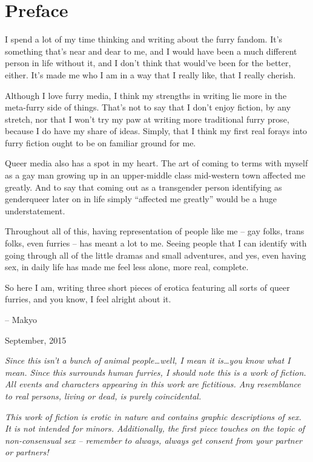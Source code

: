\chapter*{Preface}

I spend a lot of my time thinking and writing about the furry fandom.  It's something that's near and dear to me, and I would have been a much different person in life without it, and I don't think that would've been for the better, either.  It's made me who I am in a way that I really like, that I really cherish.

Although I love furry media, I think my strengths in writing lie more in the meta-furry side of things.  That's not to say that I don't enjoy fiction, by any stretch, nor that I won't try my paw at writing more traditional furry prose, because I do have my share of ideas.  Simply, that I think my first real forays into furry fiction ought to be on familiar ground for me.

Queer media also has a spot in my heart.  The art of coming to terms with myself as a gay man growing up in an upper-middle class mid-western town affected me greatly. And to say that coming out as a transgender person identifying as genderqueer later on in life simply ``affected me greatly'' would be a huge understatement.

Throughout all of this, having representation of people like me -- gay folks, trans folks, even furries -- has meant a lot to me.  Seeing people that I can identify with going through all of the little dramas and small adventures, and yes, even having sex, in daily life has made me feel less alone, more real, complete.

So here I am, writing three short pieces of erotica featuring all sorts of queer furries, and you know, I feel alright about it.

-- Makyo

September, 2015

\newpage
\textit{Since this isn't a bunch of animal people\ldots{}well, I mean it is\ldots{}you know what I mean.  Since this surrounds human furries, I should note this is a work of fiction. All events and characters appearing in this work are fictitious. Any resemblance to real persons, living or dead, is purely coincidental.}

\textit{This work of fiction is erotic in nature and contains graphic descriptions of sex.  It is not intended for minors.  Additionally, the first piece touches on the topic of non-consensual sex -- remember to always, always get consent from your partner or partners!}
